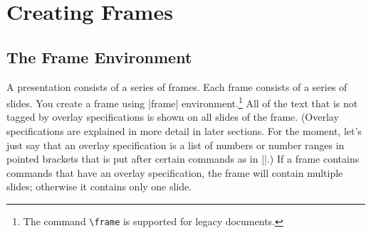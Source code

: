 %
%
%

\section{Creating Frames}
\label{section-frames}


\subsection{The Frame Environment}

A presentation consists of a series of frames. Each frame consists of a series of slides. You create a frame using |frame| environment.\footnote{The command \texttt{\textbackslash frame} is supported for legacy documents.} All of the text that is not tagged by overlay specifications is shown on all slides of the frame. (Overlay specifications are explained in more detail in later sections. For the moment, let's just say that an overlay specification is a list of numbers or number ranges in pointed brackets that is put after certain commands as in ||.) If a frame contains commands that have an overlay specification, the frame will contain multiple slides; otherwise it contains only one slide.

